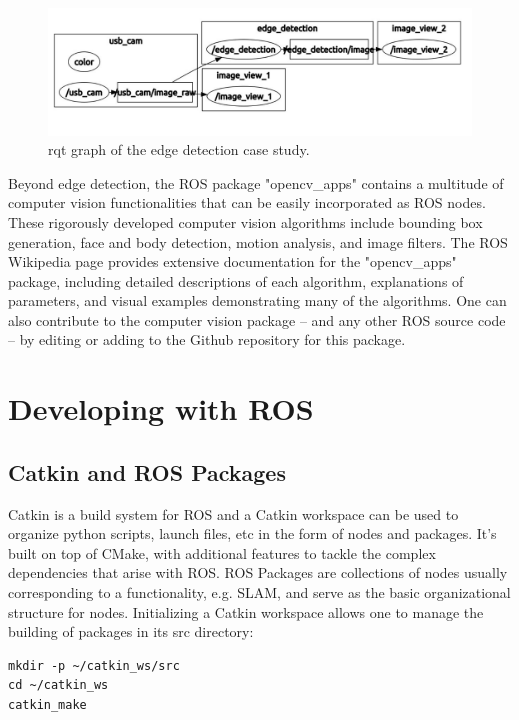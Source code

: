 \documentclass[twoside]{article}
\begin{document}
\begin{figure}[ht]
\centering
\includegraphics[width=1\textwidth]{USBCamera}
\caption{rqt graph of the edge detection case study.}
\end{figure}

Beyond edge detection, the ROS package "opencv\_apps" contains a multitude of computer vision functionalities that can be easily incorporated as ROS nodes. These rigorously developed computer vision algorithms include bounding box generation, face and body detection, motion analysis, and image filters. The ROS Wikipedia page provides extensive documentation for the "opencv\_apps" package, including detailed descriptions of each algorithm, explanations of parameters, and visual examples demonstrating many of the algorithms. One can also contribute to the computer vision package -- and any other ROS source code -- by editing or adding to the Github repository for this package.

\section{Developing with ROS}\label{development}\label{sec:development}
\subsection{Catkin and ROS Packages}
Catkin is a build system for ROS and a Catkin workspace can be used to organize python scripts, launch files, etc in the form of nodes and packages. It's built on top of CMake, with additional features to tackle the complex dependencies that arise with ROS. ROS Packages are collections of nodes usually corresponding to a functionality, e.g. SLAM, and serve as the basic organizational structure for nodes.
Initializing a Catkin workspace allows one to manage the building of packages in its src directory:

\begin{verbatim}
mkdir -p ~/catkin_ws/src
cd ~/catkin_ws
catkin_make
\end{verbatim}
\end{document}
